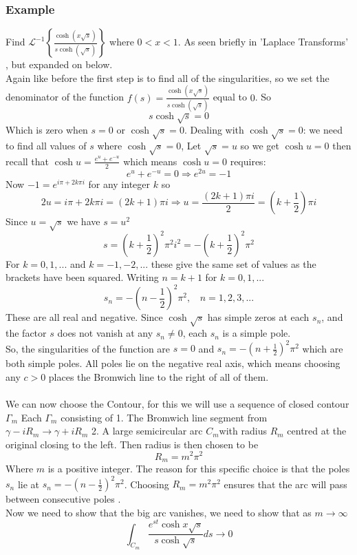\subsubsection{Example}
Find $\mathcal{L}^{-1}\left\{\frac{\cosh(x\sqrt{s})}{s\cosh(\sqrt{s})}\right\}$ where $0<x<1$. As seen briefly in 'Laplace Transforms' \cite{TransformsTheory}, but expanded on below.
\\
Again like before the first step is to find all of the singularities, so we set the denominator of the function $f(s)=\frac{\cosh(x\sqrt{s})}{s\cosh(\sqrt{s})}$ equal to $0$. So 
$$s\cosh\sqrt{s}=0$$ Which is zero when $s=0$ or $\cosh\sqrt{s}=0$. Dealing with $\cosh\sqrt{s}=0$: we need to find all values of $s$ where $\cosh\sqrt{s}=0$, Let $\sqrt{s}=u$ so we get $\cosh u=0$ then recall that $\cosh u=\frac{e^u+e^{-u}}{2}$ which means $\cosh u=0$ requires: $$e^u+e^{-u}=0\Rightarrow e^{2u}=-1$$ Now $-1=e^{i\pi+2k\pi i}$ for any integer $k$ so $$2u=i\pi+2k\pi i=(2k+1)\pi i\Rightarrow u=\frac{(2k+1)\pi i}{2}=\left( k+\frac{1}{2} \right)\pi i$$ Since $u=\sqrt{s}$ we have $s=u^2$
$$s=\left(k+\frac{1}{2}\right)^2\pi^2i^2=-\left(k+\frac{1}{2}\right)^2\pi^2$$ For $k=0,1,...$ and $k=-1,-2,...$ these give the same set of values as the brackets have been squared. Writing $n=k+1$ for $k=0,1,...$ $$s_n=-\left(n-\frac{1}{2}\right)^2\pi^2, \ \ \ \ n=1,2,3,...$$ These are all real and negative. Since $\cosh\sqrt{s}$ has simple zeros at each $s_n$, and the factor $s$ does not vanish at any $s_n\neq0$, each $s_n$ is a simple pole. 
\\
So, the singularities of the function are $s=0$ and $s_n=-\left( n+\frac{1}{2} \right)^2\pi^2$ which are both simple poles. All poles lie on the negative real axis, which means choosing any $c>0$ places the Bromwich line to the right of all of them. 
\\
\\
We can now choose the Contour, for this we will use a sequence of closed contour $\Gamma_{m}$ Each $\Gamma_m$ consisting of 1. The Bromwich line segment from $\gamma-iR_m\to\gamma+iR_m$ 2. A large semicircular arc $C_m$with radius $R_m$ centred at the original closing to the left. Then radius is then chosen to be $$R_m=m^2\pi^2$$ Where $m$ is a positive integer. The reason for this specific choice is that the poles $s_n$ lie at $s_n=-(n-\frac{1}{2})^2\pi^2$. Choosing $R_m=m^2\pi^2$ ensures that the arc will pass between consecutive poles . 
\\
Now we need to show that the big arc vanishes, we need to show that as $m\to\infty$ $$\int_{C_m}\frac{e^{st}\cosh x\sqrt{s}}{s\cosh\sqrt{s}}ds\to0$$ 
